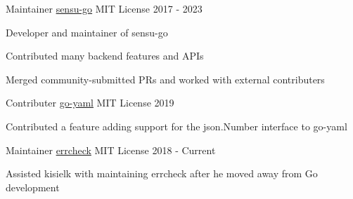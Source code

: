 \begin{cventries}
  \cventry
    {Maintainer}
    {\href{https://github.com/sensu/sensu-go}{sensu-go}}
    {MIT License}
    {2017 - 2023}
    {
      \begin{cvitems}
        \item{Developer and maintainer of sensu-go}
        \item{Contributed many backend features and APIs}
        \item{Merged community-submitted PRs and worked with external contributers}
      \end{cvitems}
    }


  \cventry
    {Contributer}
    {\href{https://github.com/go-yaml/yaml}{go-yaml}}
    {MIT License}
    {2019}
    {
      \begin{cvitems}
        \item{Contributed a feature adding support for the json.Number interface to go-yaml}
      \end{cvitems}
    }


  \cventry
  	{Maintainer}
  	{\href{https://github.com/kisielk/errcheck}{errcheck}}
  	{MIT License}
  	{2018 - Current}
  	{
	  \begin{cvitems}
	  	\item{Assisted kisielk with maintaining errcheck after he moved away from Go development}
	  \end{cvitems}
  	}
\end{cventries}
